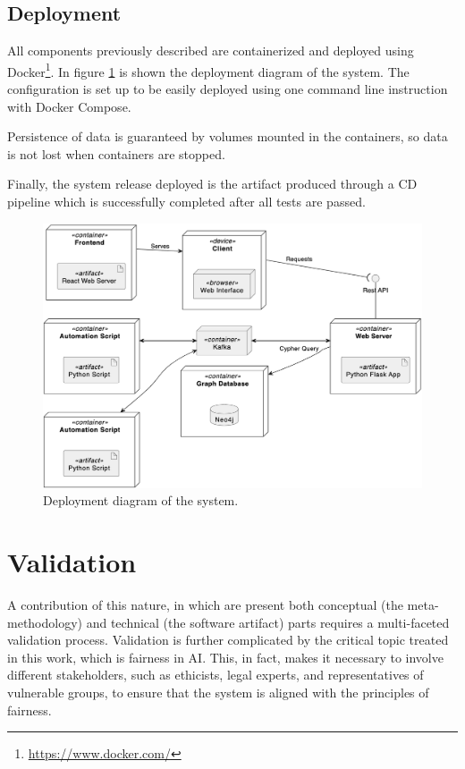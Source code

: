 \documentclass[12pt,a4paper,openright,twoside]{book}
\begin{document}
\section{Deployment}

All components previously described are containerized and deployed using Docker\footnote{\url{https://www.docker.com/}}.
%
In figure \cref{fig:deployment} is shown the deployment diagram of the system.
%
The configuration is set up to be easily deployed using one command line instruction with Docker Compose.

Persistence of data is guaranteed by volumes mounted in the containers, so data is not lost when containers are stopped.

Finally, the system release deployed is the artifact produced through a \ac{CD} pipeline which is successfully completed after all tests are passed.

\begin{figure}
    \centering
    \includegraphics[width=\linewidth]{figures/diagrams/deployment.png}
    \caption{
        Deployment diagram of the system.
    }
    \label{fig:deployment}
\end{figure}


\chapter{Validation}%
\label{chap:validation}

A contribution of this nature, in which are present both conceptual (the meta-methodology) and technical (the software artifact) parts requires a multi-faceted validation process.
%
Validation is further complicated by the critical topic treated in this work, which is fairness in \ac{AI}.
%
This, in fact, makes it necessary to involve different stakeholders, such as ethicists, legal experts, and representatives of vulnerable groups, to ensure that the system is aligned with the principles of fairness.
\end{document}
